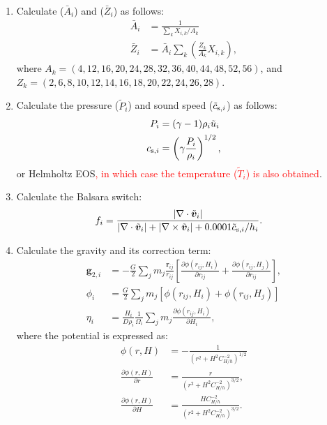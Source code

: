 \documentclass[fleqn,dvipdfmx]{article}
\newcommand{\redtext}[1]{\textcolor{red}{#1}}
\begin{document}
\begin{enumerate}
\item Calculate ($\bar{A}_i$) and ($\bar{Z}_i$) as follows:
  \begin{align}
    \bar{A}_i &= \frac{1}{\sum_k X_{i,k}/A_k} \\
    \bar{Z}_i &= \bar{A}_i \sum_k \left( \frac{Z_k}{A_k} X_{i,k}
    \right),
  \end{align}
  where $A_k = (4, 12, 16, 20, 24, 28, 32, 36, 40, 44, 48, 52, 56)$,
  and \\ $Z_k = (2, 6, 8, 10, 12, 14, 16, 18, 20, 22, 24, 26, 28)$.
  
\item Calculate the pressure ($\tilde{P}_i$) and sound speed
  ($\tilde{c}_{{\rm s},i}$) as follows:
  \begin{align}
    P_i &= (\gamma - 1) \rho_i \tilde{u}_i \\
    c_{{\rm s},i} &= \left( \gamma \frac{P_i}{\rho_i} \right)^{1/2},
  \end{align}
  or Helmholtz EOS\redtext{, in which case the temperature
    ($\tilde{T}_i$) is also obtained}.

\item Calculate the Balsara switch:
  \begin{align}
    f_i &= \frac{|\nabla \cdot \tilde{\bm{v}}_i|}{|\nabla \cdot
      \tilde{\bm{v}}_i| + |\nabla \times \tilde{\bm{v}}_i| + 0.0001
      \tilde{c}_{{\rm s},i} / h_i}.
  \end{align}

\item Calculate the gravity and its correction
  term: \label{item:gravity2}
  \begin{align}
    \bm{g}_{2,i} &= - \frac{G}{2} \sum_j m_j
    \frac{\bm{r}_{ij}}{r_{ij}} \left[ \frac{\partial
        \phi(r_{ij},H_i)}{\partial r_{ij}} + \frac{\partial
        \phi(r_{ij},H_j)}{\partial r_{ij}} \right], \\
    \phi_i &= \frac{G}{2} \sum_j m_j \left[ \phi(r_{ij},H_i) +
      \phi(r_{ij},H_j) \right] \\
    \eta_i &= \frac{H_i}{D\rho_i} \frac{1}{\Omega_i} \sum_j m_j
    \frac{\partial \phi(r_{ij},H_i)}{\partial H_i},
  \end{align}
  where the potential is expressed as:
  \begin{align}
    \phi(r,H) &= - \frac{1}{\left( r^2 + H^2 C_{H/h}^{-2}
      \right)^{1/2}} \\
    \frac{\partial \phi(r,H)}{\partial r} &= \frac{r}{\left( r^2 + H^2
      C_{H/h}^{-2} \right)^{3/2}}, \\
    \frac{\partial \phi(r,H)}{\partial H} &=
    \frac{HC_{H/h}^{-2}}{\left( r^2 + H^2 C_{H/h}^{-2} \right)^{3/2}}.
  \end{align}


\end{enumerate}
\end{document}
